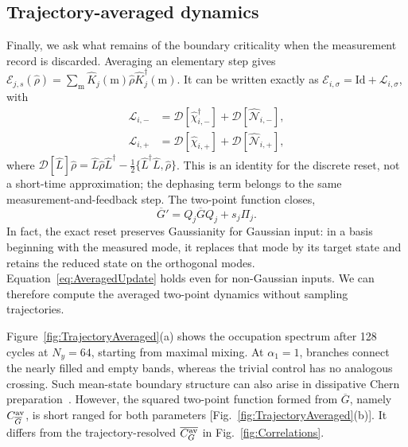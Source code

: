\documentclass[aps,prb,10pt,twocolumn,superscriptaddress,longbibliography,floatfix]{revtex4-2}
\newcommand{\mc}[1]{\mathcal{#1}}
\begin{document}
{\color{blue}
\subsection{Trajectory-averaged dynamics}
\label{sec:TrajectoryAveraged}

Finally, we ask what remains of the boundary criticality when the measurement record is discarded. Averaging an elementary step gives $\mc E_{j,s}(\hat\rho)=\sum_{\mathrm m}\hat K_j(\mathrm m)\hat\rho\hat K_j^\dagger(\mathrm m)$. It can be written exactly as $\mc E_{i,\sigma}=\mathrm{Id}+\mc L_{i,\sigma}$, with
\begin{align}
 \mc L_{i,-}&=\mc D[\hat\chi_{i,-}^\dagger]+\mc D[\hat{\mc N}_{i,-}],\nonumber\\
 \mc L_{i,+}&=\mc D[\hat\chi_{i,+}]+\mc D[\hat{\mc N}_{i,+}],
 \label{eq:AveragedChannel}
\end{align}
where $\mc D[\hat L]\hat\rho=\hat L\hat\rho\hat L^\dagger-\tfrac12\{\hat L^\dagger\hat L,\hat\rho\}$. This is an identity for the discrete reset, not a short-time approximation; the dephasing term belongs to the same measurement-and-feedback step. The two-point function closes,
\begin{equation}
 \overline G'=Q_j\overline GQ_j+s_j\Pi_j.
 \label{eq:AveragedUpdate}
\end{equation}
In fact, the exact reset preserves Gaussianity for Gaussian input: in a basis beginning with the measured mode, it replaces that mode by its target state and retains the reduced state on the orthogonal modes. Equation~\eqref{eq:AveragedUpdate} holds even for non-Gaussian inputs. We can therefore compute the averaged two-point dynamics without sampling trajectories.

Figure~\ref{fig:TrajectoryAveraged}(a) shows the occupation spectrum after 128 cycles at $N_y=64$, starting from maximal mixing. At $\alpha_1=1$, branches connect the nearly filled and empty bands, whereas the trivial control has no analogous crossing. Such mean-state boundary structure can also arise in dissipative Chern preparation~\cite{Goldstein2019}. However, the squared two-point function formed from $\overline G$, namely $C_{\overline G}^{\rm av}$, is short ranged for both parameters [Fig.~\ref{fig:TrajectoryAveraged}(b)]. It differs from the trajectory-resolved $\overline{C_G^{\rm av}}$ in Fig.~\ref{fig:Correlations}.

}
\end{document}
